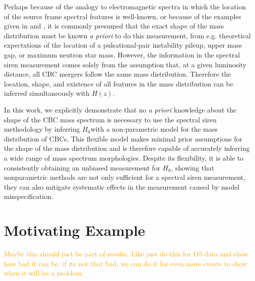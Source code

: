 \documentclass[]{aastex631}
\newcommand{\Ho}{$H_0$}
\newcommand{\comment}[1]{\textcolor{orange}{#1}}
\begin{document}
Perhaps because of the analogy to electromagnetic spectra in which the location of the source frame spectral features is well-known, or because of the examples given in \cite{farr_future_2019} and \cite{chernoff+fin}, it is commonly presumed that the exact shape of the mass distribution must be known \emph{a priori} to do this measurement, from e.g. theoretical expectations of the location of a pulsational-pair instability pileup, upper mass gap, or maximum neutron star mass.
However, the information in the spectral siren measurement comes solely from the assumption that, at a given luminosity distance, all CBC mergers follow the same mass distribution.
Therefore the location, shape, and existence of all features in the mass distribution can be inferred simultaneously with $H(z)$.

In this work, we explicitly demonstrate that no \emph{a priori} knowledge about the shape of the CBC mass spectrum is necessary to use the spectral siren methodology by inferring \Ho with a non-parametric model for the mass distribution of CBCs. 
This flexible model makes minimal prior assumptions for the shape of the mass distribution and is therefore capable of accurately inferring a wide range of mass spectrum morphologies.
Despite its flexibility, it is able to consistently obtaining an unbiased measurement for \Ho, showing that nonparametric methods are not only sufficient for a spectral siren measurement, they can also mitigate systematic effects in the measurement caused by model misspecification.

\section{Motivating Example}
\comment{Maybe this should just be part of results. Like just do this for O5 data and show how bad it can be. if its not that bad, we can do it for even more events to show when it will be a problem.}
\end{document}
